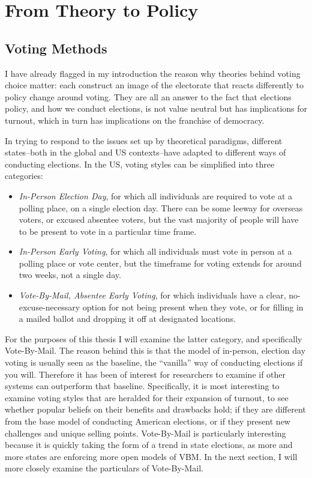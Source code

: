 \documentclass[12pt,twoside]{reedthesis}
\begin{document}
  \section{From Theory to Policy}\label{from-theory-to-policy}
  
  \subsection{Voting Methods}\label{voting-methods}
  
  I have already flagged in my introduction the reason why theories behind
  voting choice matter: each construct an image of the electorate that
  reacts differently to policy change around voting. They are all an
  answer to the fact that elections policy, and how we conduct elections,
  is not value neutral but has implications for turnout, which in turn has
  implications on the franchise of democracy.
  
  In trying to respond to the issues set up by theoretical paradigms,
  different states--both in the global and US contexts--have adapted to
  different ways of conducting elections. In the US, voting styles can be
  simplified into three categories:
  
  \begin{itemize}
  \item
    \emph{In-Person Election Day}, for which all individuals are required
    to vote at a polling place, on a single election day. There can be
    some leeway for overseas voters, or excused absentee voters, but the
    vast majority of people will have to be present to vote in a
    particular time frame.
  \item
    \emph{In-Person Early Voting}, for which all individuals must vote in
    person at a polling place or vote center, but the timeframe for voting
    extends for around two weeks, not a single day.
  \item
    \emph{Vote-By-Mail, Absentee Early Voting}, for which individuals have
    a clear, no-excuse-necessary option for not being present when they
    vote, or for filling in a mailed ballot and dropping it off at
    designated locations.
  \end{itemize}
  
  For the purposes of this thesis I will examine the latter category, and
  specifically Vote-By-Mail. The reason behind this is that the model of
  in-person, election day voting is usually seen as the baseline, the
  ``vanilla'' way of conducting elections if you will. Therefore it has
  been of interest for researchers to examine if other systems can
  outperform that baseline. Specifically, it is most interesting to
  examine voting styles that are heralded for their expansion of turnout,
  to see whether popular beliefs on their benefits and drawbacks hold; if
  they are different from the base model of conducting American elections,
  or if they present new challenges and unique selling points.
  Vote-By-Mail is particularly interesting because it is quickly taking
  the form of a trend in state elections, as more and more states are
  enforcing more open models of VBM. In the next section, I will more
  closely examine the particulars of Vote-By-Mail.
  
\end{document}

